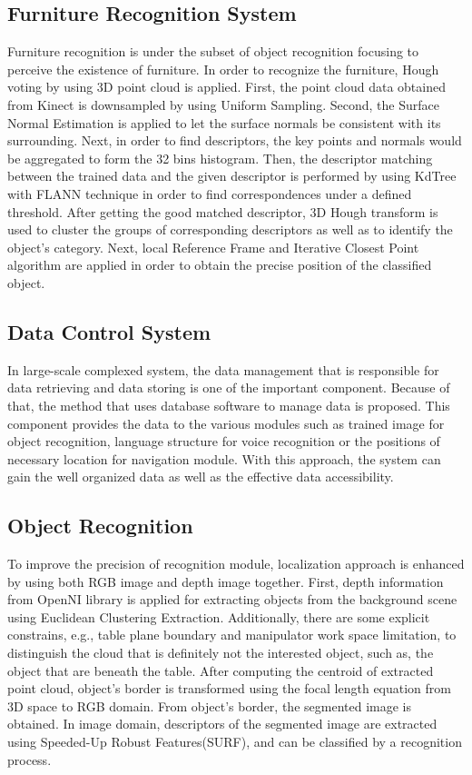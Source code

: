 \documentclass{llncs}
\begin{document}
\subsection{Furniture Recognition System}

Furniture recognition is under the subset of object recognition focusing to perceive the existence of furniture. In order to recognize the furniture, Hough voting by using 3D point cloud is applied. First, the point cloud data obtained from Kinect is downsampled by using Uniform Sampling. Second, the Surface Normal Estimation is applied to let the surface normals be consistent with its surrounding. Next, in order to find descriptors, the key points and normals would be aggregated to form the 32 bins histogram. Then, the descriptor matching between the trained data and the given descriptor is performed by using KdTree with FLANN technique in order to find correspondences under a defined threshold. After getting the good matched descriptor, 3D Hough transform is used to cluster the groups of corresponding descriptors as well as to identify the object's category. Next, local Reference Frame and Iterative Closest Point algorithm are applied in order to obtain the precise position of the classified object.\cite{furniture}

\subsection{Data Control System}
In large-scale complexed system, the data management that is responsible for data retrieving and data storing  is one of the important component. Because of that, the method that uses database software to manage data is proposed. This component provides the data to the various modules such as trained image for object recognition, language structure for voice recognition or the positions of necessary location for navigation module. With this approach, the system can gain the well organized data as well as the effective data accessibility.


\subsection{Object Recognition}
    
To improve the precision of recognition module, localization approach is enhanced by using both RGB image and depth image together. First, depth information from OpenNI library is applied for extracting objects from the background scene using Euclidean Clustering Extraction\cite{rudu.thesis}. Additionally, there are some explicit constrains, e.g., table plane boundary and manipulator work space limitation, to distinguish the cloud that is definitely not the interested object, such as, the object that are beneath the table. After computing the centroid of extracted point cloud, object's border is transformed using the focal length equation from 3D space to RGB domain. From object's border, the segmented image is obtained. In image domain, descriptors of the segmented image are extracted using Speeded-Up Robust Features(SURF), and can be classified by a recognition process.
\end{document}
